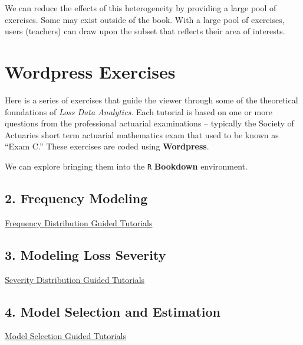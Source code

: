 \documentclass[
]{book}
\begin{document}
We can reduce the effects of this heterogeneity by providing a large pool of exercises. Some may exist outside of the book. With a large pool of exercises, users (teachers) can draw upon the subset that reflects their area of interests.

\hypertarget{wordpress-exercises}{%
\section{Wordpress Exercises}\label{wordpress-exercises}}

Here is a series of exercises that guide the viewer through some of the theoretical foundations of \emph{Loss Data Analytics}. Each tutorial is based on one or more questions from the professional actuarial examinations -- typically the Society of Actuaries short term actuarial mathematics exam that used to be known as ``Exam C.'' These exercises are coded using \textbf{Wordpress}.

We can explore bringing them into the \texttt{R} \textbf{Bookdown} environment.

\hypertarget{frequency-modeling}{%
\subsection{2. Frequency Modeling}\label{frequency-modeling}}

\href{https://www.ssc.wisc.edu/~jfrees/loss-data-analytics/loss-data-analytics-problems/}{Frequency Distribution Guided Tutorials}

\hypertarget{modeling-loss-severity}{%
\subsection{3. Modeling Loss Severity}\label{modeling-loss-severity}}

\href{http://www.ssc.wisc.edu/~jfrees/loss-data-analytics/chapter-3-modeling-loss-severity/loss-data-analytics-severity-problems/}{Severity Distribution Guided Tutorials}

\hypertarget{model-selection-and-estimation}{%
\subsection{4. Model Selection and Estimation}\label{model-selection-and-estimation}}

\href{http://www.ssc.wisc.edu/~jfrees/loss-data-analytics/loss-data-analytics-model-selection/}{Model Selection Guided Tutorials}
\end{document}
